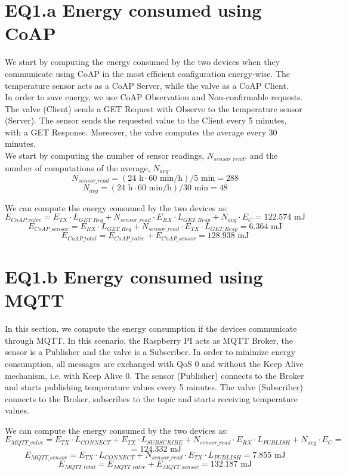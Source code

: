 \section{EQ1.a Energy consumed using CoAP}
We start by computing the energy consumed by the two devices when they communicate using CoAP in the most efficient configuration energy-wise. The temperature sensor acts as a CoAP Server, while the valve as a CoAP Client.\\
In order to save energy, we use CoAP Observation and Non-confirmable requests. The valve (Client) sends a GET Request with Observe to the temperature sensor (Server). The sensor sends the requested value to the Client every 5 minutes, with a GET Response. Moreover, the valve computes the average every 30 minutes.\\
We start by computing the number of sensor readings, $N_{sensor\_read}$, and the number of computations of the average, $N_{avg}$.
\[N_{sensor\_read} = (24\text{ h}  \cdot 60 \text{ min/h}) / 5 \text{ min} = 288\]
\[N_{avg} = (24\text{ h}  \cdot 60 \text{ min/h}) / 30 \text{ min} = 48\]

We can compute the energy consumed by the two devices as:
\[E_{CoAP\_valve} = E_{TX} \cdot L_{GET\_Req} + N_{sensor\_read} \cdot E_{RX} \cdot L_{GET\_Resp} + N_{avg} \cdot E_{C} = 122.574 \text{ mJ}\]
\[E_{CoAP\_sensor} = E_{RX} \cdot L_{GET\_Req} + N_{sensor\_read} \cdot E_{TX} \cdot L_{GET\_Resp} = 6.364 \text{ mJ}\]
\[E_{CoAP\_total} = E_{CoAP\_valve} + E_{CoAP\_sensor} = 128.938 \text{ mJ}\]

\section{EQ1.b Energy consumed using MQTT}
In this section, we compute the energy consumption if the devices communicate through MQTT. In this scenario, the Raspberry PI acts as MQTT Broker, the sensor is a Publisher and the valve is a Subscriber. In order to minimize energy consumption, all messages are exchanged with QoS 0 and without the Keep Alive mechanism, i.e. with Keep Alive 0. The sensor (Publisher) connects to the Broker and starts publishing temperature values every 5 minutes. The valve (Subscriber) connects to the Broker, subscribes to the topic and starts receiving temperature values.

We can compute the energy consumed by the two devices as:
\[E_{MQTT\_valve} = E_{TX} \cdot L_{CONNECT} + E_{TX} \cdot L_{SUBSCRIBE} + N_{sensor\_read} \cdot E_{RX} \cdot L_{PUBLISH} + N_{avg} \cdot E_{C} =\]
\[= 124.332 \text{ mJ}\]
\[E_{MQTT\_sensor} = E_{TX} \cdot L_{CONNECT} + N_{sensor\_read} \cdot E_{TX} \cdot L_{PUBLISH} = 7.855 \text{ mJ}\]
\[E_{MQTT\_total} = E_{MQTT\_valve} + E_{MQTT\_sensor} = 132.187 \text{ mJ}\]

